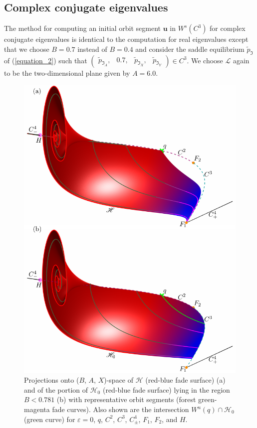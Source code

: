 \documentclass{ws-ijbc}
\begin{document}
\subsection{Complex conjugate eigenvalues}

The method for computing an initial orbit segment $\mathbf{u}$ in $W^{s}(C^3)$ for complex conjugate eigenvalues is identical to the computation for real eigenvalues except that we choose $B=0.7$ instead of $B=0.4$ and consider the saddle equilibrium $\tilde{p}_{\Im}$ of (\ref{equation_2}) such that $\begin{pmatrix}\tilde{p}_{\Im_A}, &0.7, &\tilde{p}_{\Im_X}, &\tilde{p}_{\Im_Y} \end{pmatrix} \in C^3$.  We choose $\mathscr{L}$ again to be the two-dimensional plane given by $A=6.0$.

\begin{figure}[H]
\centering
\includegraphics[]{./figures/MKMO_11.pdf}
\caption{Projections onto ($B$, $A$, $X$)-space of $\mathscr{H}$ (red-blue fade surface) (a) and of the portion of $\mathscr{H}_0$ (red-blue fade surface) lying in the region $B < 0.781$ (b) with representative orbit segments (forest green-magenta fade curves).  Also shown are the intersection $W^u(q)\cap\mathscr{H}_0$ (green curve) for $\varepsilon=0$, $q$, $C^2$, $C^3$, $C^4_\pm$, $F_1$, $F_2$, and $H$.}
\label{figure_11}
\end{figure}
\end{document}
